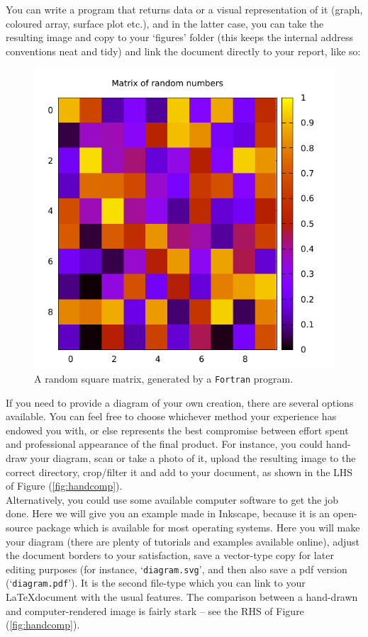 You can write a program that returns data or a visual representation of it (graph, coloured array, surface plot etc.), and in the latter case, you can take the resulting image and copy to your `figures' folder (this keeps the internal address conventions neat and tidy) and link the document directly to your report, like so:\\

\begin{figure}[h!]
\begin{center}
\includegraphics[width=0.40\linewidth]{figures/random_matrix.pdf}
\end{center}
\caption{A random square matrix, generated by a \texttt{Fortran} program.}
\label{fig:random_matrix}
\end{figure} 


If you need to provide a diagram of your own creation, there are several options available. You can feel free to choose whichever method your experience has endowed you with, or else represents the best compromise between effort spent and professional appearance of the final product. For instance, you could hand-draw your diagram, scan or take a photo of it, upload the resulting image to the correct directory, crop/filter it and add to your document, as shown in the LHS of Figure (\ref{fig:handcomp}).\\

Alternatively, you could use some available computer software to get the job done. Here we will give you an example made in Inkscape, because it is an open-source package which is available for most operating systems. Here you will make your diagram (there are plenty of tutorials and examples available online), adjust the document borders to your satisfaction, save a vector-type copy for later editing purposes (for instance, `\texttt{diagram.svg}', and then also save a pdf version (`\texttt{diagram.pdf}'). It is the second file-type which you can link to your \LaTeX document with the usual features. The comparison between a hand-drawn and computer-rendered image is fairly stark -- see the RHS of Figure (\ref{fig:handcomp}).\\

